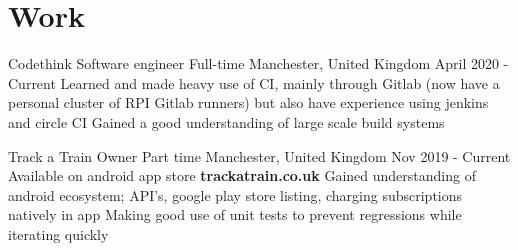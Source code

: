 \documentclass{my_cv}
\begin{document}
\section{Work}

\workDetails
{Codethink}
{Software engineer}
{Full-time}
{Manchester, United Kingdom}
{April 2020 - Current}
\workdetails
{Learned and made heavy use of CI, mainly through Gitlab (now have a personal cluster of RPI Gitlab runners) but also have experience using jenkins and circle CI}
{Gained a good understanding of large scale build systems}
\stopworkdetails

\workDetails
{Track a Train}
{Owner}
{Part time}
{Manchester, United Kingdom}
{Nov 2019 - Current}
\workdetails
{Available on android app store \textbf{trackatrain.co.uk}} %
{Gained understanding of android ecosystem; API's, google play store listing, charging subscriptions natively in app}
{Making good use of unit tests to prevent regressions while iterating quickly}
\stopworkdetails
\end{document}
